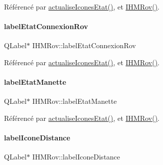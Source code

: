 Référencé par \hyperlink{class_i_h_m_rov_abbfcdc154a6ae7f941d186f6c90a5a2b}{actualise\+Icones\+Etat()}, et \hyperlink{class_i_h_m_rov_a5dac1fb4612866cc61f699a415e0ef6b}{I\+H\+M\+Rov()}.

\mbox{\label{class_i_h_m_rov_a83a10634509cf2d32a0bcee159eecbc3}} 
\paragraph{\texorpdfstring{label\+Etat\+Connexion\+Rov}{labelEtatConnexionRov}}
{\footnotesize\ttfamily Q\+Label$\ast$ I\+H\+M\+Rov\+::label\+Etat\+Connexion\+Rov\hspace{0.3cm}{\ttfamily [private]}}



Référencé par \hyperlink{class_i_h_m_rov_abbfcdc154a6ae7f941d186f6c90a5a2b}{actualise\+Icones\+Etat()}, et \hyperlink{class_i_h_m_rov_a5dac1fb4612866cc61f699a415e0ef6b}{I\+H\+M\+Rov()}.

\mbox{\label{class_i_h_m_rov_ad62586ec4cef61ef851626515fd0f72a}} 
\paragraph{\texorpdfstring{label\+Etat\+Manette}{labelEtatManette}}
{\footnotesize\ttfamily Q\+Label$\ast$ I\+H\+M\+Rov\+::label\+Etat\+Manette\hspace{0.3cm}{\ttfamily [private]}}



Référencé par \hyperlink{class_i_h_m_rov_abbfcdc154a6ae7f941d186f6c90a5a2b}{actualise\+Icones\+Etat()}, et \hyperlink{class_i_h_m_rov_a5dac1fb4612866cc61f699a415e0ef6b}{I\+H\+M\+Rov()}.

\mbox{\label{class_i_h_m_rov_ae8e7eef50b55104e1490191e3bdcb8d9}} 
\paragraph{\texorpdfstring{label\+Icone\+Distance}{labelIconeDistance}}
{\footnotesize\ttfamily Q\+Label$\ast$ I\+H\+M\+Rov\+::label\+Icone\+Distance\hspace{0.3cm}{\ttfamily [private]}}



